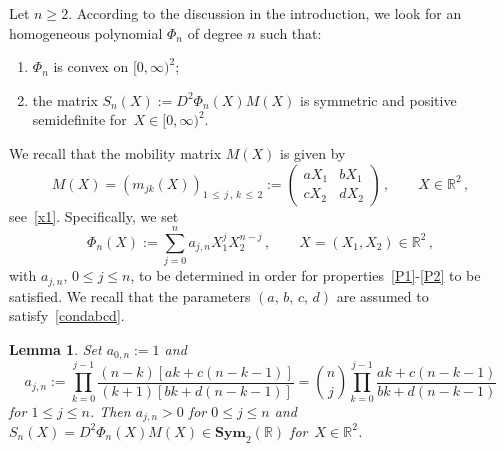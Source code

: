 \documentclass[10pt]{amsart}
\newtheorem{lemm}[theo]{Lemma}\newtheorem{prop}[theo]{Proposition}\newtheorem{coro}[theo]{Corollary}\newtheorem{conj}[theo]{Conjecture}
\theoremstyle{definition}\newtheorem{defi}[theo]{Definition}\newtheorem{rema}[theo]{Remark}\newtheorem{exam}[theo]{Example}\newtheorem{exem}[theo]{Example}\newtheorem{nota}[theo]{Notation}
\newcommand{\bbR}{\mathbb{R}}
\newcommand{\bSym}{\mathbf{Sym}}
\newcommand*{\Penumi}{\renewcommand*{\theenumi}{P\arabic{enumi}}}
\begin{document}
Let $n\ge 2$. According to the discussion in the introduction, we look for an homogeneous polynomial $\Phi_n$ of degree $n$ such that:
\begin{enumerate}\Penumi
\item\label{P1} $\Phi_n$ is convex on $[0,\infty)^2$;
\item\label{P2} the matrix $S_n(X) := D^2\Phi_n(X) M(X)$ is symmetric and positive semidefinite for~${X\in [0,\infty)^2}$.
\end{enumerate}
We recall that the mobility matrix $M(X)$ is given by
\begin{equation*}
M(X) = \left(m_{jk}(X)\right)_{1\,\le\,j\,,\,k\,\le\,2} :=
\begin{pmatrix}
a X_1 & b X_1 \\
c X_2 & d X_2
\end{pmatrix}\,, \qquad X\in\bbR^2\,,
\end{equation*}
see~\eqref{x1}. Specifically, we set
\begin{equation}\label{Polen}
\Phi_n(X) := \sum_{j=0}^n a_{j,n} X_1^j X_2^{n-j}\,, \qquad X=(X_1,X_2)\in \bbR^2\,, 
\end{equation}
with $a_{j,n}$, $0\leq j\leq n$, to be determined in order for properties~\eqref{P1}-\eqref{P2} to be satisfied. We recall that the parameters $(a,\, b,\, c,\, d)$ are assumed to satisfy~\eqref{condabcd}.


\begin{lemm}\label{lem.p1}
Set $a_{0,n}:=1$ and
\begin{equation}\label{ajn}
a_{j,n}:= \prod_{k=0}^{j-1}\frac{(n-k)[ak+c(n-k-1)]}{(k+1)[bk+d(n-k-1)]} = \binom{n}{j} \prod_{k=0}^{j-1}\frac{ak+c(n-k-1)}{bk+d(n-k-1)}
\end{equation}
for $1\leq j\leq n$. Then $a_{j,n}>0$ for $0\le j \le n$ and $S_n(X) = D^2\Phi_n(X) M(X)\in {\bSym_2(\bbR)}$ for~$X\in\bbR^2$.
\end{lemm}
\end{document}
